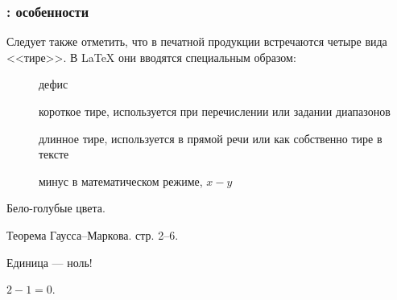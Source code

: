 \documentclass{beamer}
\begin{document}
\begin{frame}[fragile]
\frametitle{\insertsubsection{}: особенности}
\vspace{-2ex}
\small
Следует также отметить, что в печатной продукции встречаются четыре
вида <<тире>>. В \LaTeX{} они вводятся специальным образом:
\vspace{-1ex}
\begin{description}
  \item[\keystrokebftt{-}] дефис
  \item[\keystrokebftt{-}\keystrokebftt{-}] короткое тире, используется
    при перечислении или задании диапазонов
  \item[\keystrokebftt{-}\keystrokebftt{-}\keystrokebftt{-}] длинное тире,
    используется в прямой речи или как собственно тире в тексте
  \item[\keystrokebftt{\$}\keystrokebftt{-}\keystrokebftt{\$}] минус в
    математическом режиме, $x - y$
\end{description}
\begin{exampletwouptiny}
Бело-голубые цвета.

Теорема Гаусса--Маркова. стр. 2--6.

Единица --- ноль!

$2 - 1 = 0$.
\end{exampletwouptiny}
\end{frame}
\end{document}
